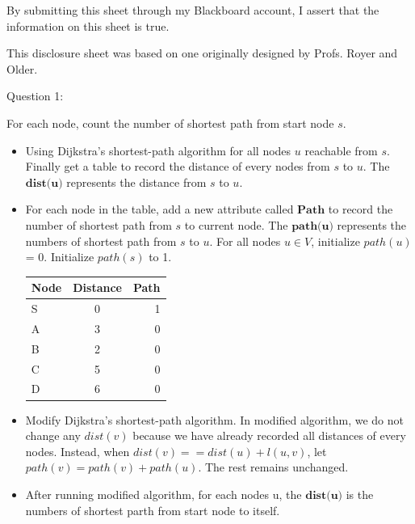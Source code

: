 \documentclass[12pt]{article}
\begin{document}
\vspace*{40ex}

By submitting this sheet through my Blackboard account, I assert that the information on this sheet is true.


\hfill {\tiny This disclosure sheet was based on one originally designed
  by
  Profs. Royer and Older.}


\pagebreak
\noindent
\large Question 1: \vspace{5mm} \par
\normalsize 
For each node, count the number of shortest path from start node $s$.
\begin{itemize}
  \item	Using Dijkstra’s shortest-path algorithm for all nodes $u$ reachable from $s$. 
	Finally get a table to record the distance of every nodes from $s$ to $u$. The $\textbf{dist(u)}$ represents the distance from $s$ to $u$. 
  \item For each node in the table, add a new attribute called $\textbf{Path}$ to record the number of shortest path from $s$ to current node. 
	The $\textbf{path(u)}$ represents the numbers of shortest path from $s$ to $u$. For all nodes $u \in V$, initialize $path(u)$ = 0. Initialize $path(s)$ to 1. 
	 \par
	\begin{table}[h!]
	  \begin{center}
	    \label{tab:table1}
	    \begin{tabular}{l|c|r}
	      \textbf{Node} & \textbf{Distance} & \textbf{Path}\\
	      \hline
	      S & 0 & 1\\
	      A & 3 & 0\\
	      B & 2 & 0\\
	      C & 5 & 0\\
	      D & 6 & 0\\
	    \end{tabular}
	  \end{center}
	\end{table}
  \item Modify Dijkstra’s shortest-path algorithm.
	In modified algorithm, we do not change any $dist(v)$ because we have already recorded all distances of every nodes. 
	Instead, when $dist(v) == dist(u) + l(u, v)$, let $path(v) = path(v) + path(u)$. The rest remains unchanged.
  \item After running modified algorithm, for each nodes u, the $\textbf{dist(u)}$ is the numbers of shortest parth from start node to itself. 
\end{itemize}
\end{document}
